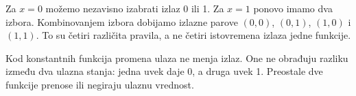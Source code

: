 
Za \(x=0\) možemo nezavisno izabrati izlaz 0 ili 1. Za \(x=1\) ponovo imamo dva izbora. Kombinovanjem izbora dobijamo izlazne parove \((0,0)\), \((0,1)\), \((1,0)\) i \((1,1)\). To su četiri različita pravila, a ne četiri istovremena izlaza jedne funkcije.

Kod konstantnih funkcija promena ulaza ne menja izlaz. One ne obrađuju razliku između dva ulazna stanja: jedna uvek daje 0, a druga uvek 1. Preostale dve funkcije prenose ili negiraju ulaznu vrednost.
